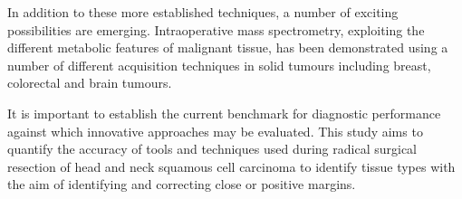 In addition to these more established techniques, a number of exciting possibilities are emerging. 
Intraoperative mass spectrometry, exploiting the different metabolic features of malignant tissue, has been demonstrated using a number of different acquisition techniques in solid tumours including breast, colorectal and brain tumours\cite{tzafetasIntelligentKnifeIKnife2020, masonLipidomicProfilingColorectal2021, balogIntraoperativeTissueIdentification2013}.

It is important to establish the current benchmark for diagnostic performance against which innovative approaches may be evaluated.
This study aims to quantify the accuracy of tools and techniques used during radical surgical resection of head and neck squamous cell carcinoma to identify tissue types with the aim of identifying and correcting close or positive margins.


